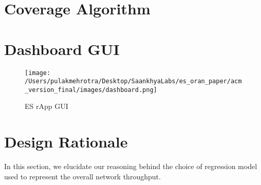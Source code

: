 \clearpage
\appendix
\newpage

\section{Coverage Algorithm}
\label{sec:coverage_algo}

  

\section{Dashboard GUI}
\label{sec:dashboard}

\begin{figure}[ht]
  \centering
  \texttt{[image: /Users/pulakmehrotra/Desktop/SaankhyaLabs/es\_oran\_paper/acm\_version\_final/images/dashboard.png]}
  \caption{ES rApp GUI}
  \label{fig:dashboard}
\end{figure}

\section{Design Rationale}
\label{sec:design_rationale}

In this section, we elucidate our reasoning behind the choice of regression model used to represent the overall network throughput.

